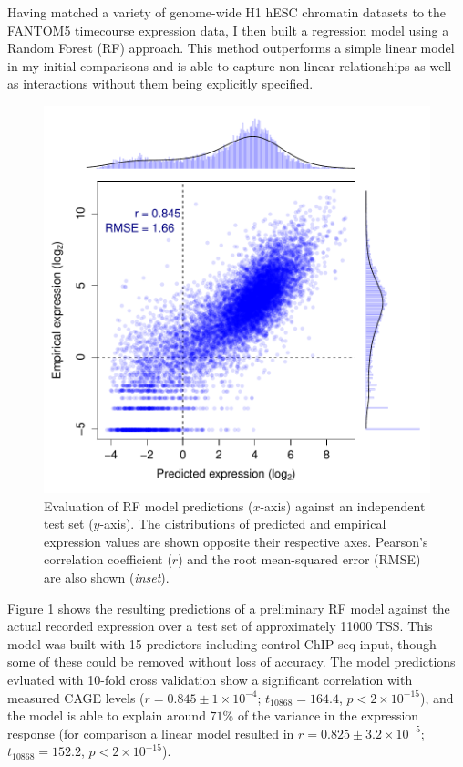 \documentclass[a4paper,11pt,oneside]{book}
\begin{document}
Having matched a variety of genome-wide H1 hESC chromatin datasets
to the FANTOM5 timecourse expression data, I then built a regression
model using a Random Forest (RF) approach.\cite{Breiman2001} This method outperforms a simple
linear model in my initial comparisons and is able to capture non-linear relationships as well
as interactions without them being explicitly specified.\cite{Diaz2006} \\

\begin{figure}
\begin{center} 
\includegraphics[width=.9\textwidth]{figs/RandomForest_10CV_50d.pdf}
\captionsetup{width=\textwidth} 
\caption{Evaluation of RF model predictions ($x$-axis) against an independent
  test set ($y$-axis). The distributions of predicted and empirical
  expression values are shown opposite their
  respective axes. Pearson's correlation coefficient ($r$) and the root
  mean-squared error (RMSE) are also shown (\emph{inset}).
}\label{fig:model}
\end{center} 
\end{figure} 

Figure \ref{fig:model} shows the resulting predictions of a
preliminary RF model against the actual recorded expression over a
test set of approximately 11000 TSS. This model was built with 15
predictors including control ChIP-seq input, though some of these could be
removed without loss of accuracy. The model predictions evluated with
10-fold cross validation show a
significant correlation with measured CAGE levels ($ r = 0.845\pm
1 \times 10^{-4}$; $t_{10868} = 164.4$,
$p < 2 \times 10^{-15}$), and the model is able to explain around
$71\%$ of the variance in the expression response (for comparison a
linear model resulted in $r = 0.825 \pm 3.2 \times 10^{-5}$; $t_{10868} = 152.2$,
$p < 2 \times 10^{-15}$). \\
\end{document}
